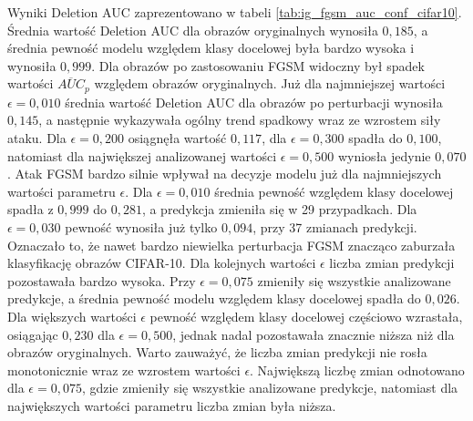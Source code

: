 Wyniki Deletion AUC zaprezentowano w tabeli \ref{tab:ig_fgsm_auc_conf_cifar10}. Średnia wartość Deletion AUC dla obrazów oryginalnych wynosiła $0{,}185$, a średnia pewność modelu względem klasy docelowej była bardzo wysoka i wynosiła $0{,}999$. Dla obrazów po zastosowaniu FGSM widoczny był spadek wartości $\overline{AUC}_{p}$ względem obrazów oryginalnych. Już dla najmniejszej wartości $\epsilon = 0{,}010$ średnia wartość Deletion AUC dla obrazów po perturbacji wynosiła $0{,}145$, a następnie wykazywała ogólny trend spadkowy wraz ze wzrostem siły ataku. Dla $\epsilon = 0{,}200$ osiągnęła wartość $0{,}117$, dla $\epsilon = 0{,}300$ spadła do $0{,}100$, natomiast dla największej analizowanej wartości $\epsilon = 0{,}500$ wyniosła jedynie $0{,}070$. Atak FGSM bardzo silnie wpływał na decyzje modelu już dla najmniejszych wartości parametru $\epsilon$. Dla $\epsilon = 0{,}010$ średnia pewność względem klasy docelowej spadła z $0{,}999$ do $0{,}281$, a predykcja zmieniła się w 29 przypadkach. Dla $\epsilon = 0{,}030$ pewność wynosiła już tylko $0{,}094$, przy 37 zmianach predykcji. Oznaczało to, że nawet bardzo niewielka perturbacja FGSM znacząco zaburzała klasyfikację obrazów CIFAR-10. Dla kolejnych wartości $\epsilon$ liczba zmian predykcji pozostawała bardzo wysoka. Przy $\epsilon = 0{,}075$ zmieniły się wszystkie analizowane predykcje, a średnia pewność modelu względem klasy docelowej spadła do $0{,}026$. Dla większych wartości $\epsilon$ pewność względem klasy docelowej częściowo wzrastała, osiągając $0{,}230$ dla $\epsilon = 0{,}500$, jednak nadal pozostawała znacznie niższa niż dla obrazów oryginalnych. Warto zauważyć, że liczba zmian predykcji nie rosła monotonicznie wraz ze wzrostem wartości $\epsilon$. Największą liczbę zmian odnotowano dla $\epsilon = 0{,}075$, gdzie zmieniły się wszystkie analizowane predykcje, natomiast dla największych wartości parametru liczba zmian była niższa.

